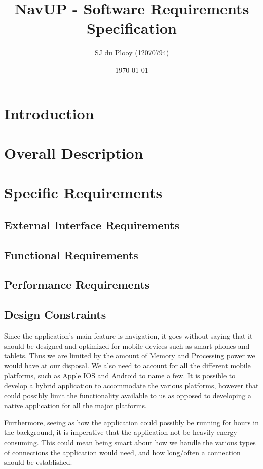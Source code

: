 \documentclass[12pt]{article}
\begin{document}
\title{NavUP - Software Requirements Specification}
\author{SJ du Plooy (12070794)}
\date{\today}
\maketitle

\section{Introduction}

\section{Overall Description}

\section{Specific Requirements}

	\subsection{External Interface Requirements}
	\subsection{Functional Requirements}
	\subsection{Performance Requirements}
	\subsection{Design Constraints}
	Since the application’s main feature is navigation, it goes without saying that it should be designed and optimized for mobile devices such as smart phones and tablets.  Thus we are limited by the amount of Memory and Processing power we would have at our disposal.  We also need to account for all the different mobile platforms, such as Apple IOS and Android to name a few.  It is possible to develop a hybrid application to accommodate the various platforms, however that could possibly limit the functionality available to us as opposed to developing a native application for all the major platforms.  
	
	Furthermore, seeing as how the application could possibly be running for hours in the background, it is imperative that the application not be heavily energy consuming.  This could mean being smart about how we handle the various types of connections the application would need, and how long/often a connection should be established.  
	
\end{document}
